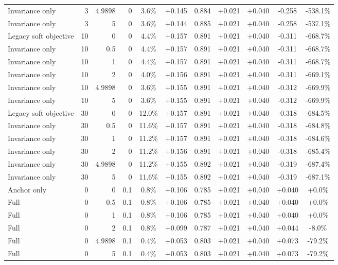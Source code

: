 \begin{table}[htbp]
\begin{tabular}{lrrrccccccc}
Invariance only & 3 & 4.9898 & 0 & 3.6\% & +0.145 & 0.884 & +0.021 & +0.040 & -0.258 & -538.1\% \\
Invariance only & 3 & 5 & 0 & 3.6\% & +0.144 & 0.885 & +0.021 & +0.040 & -0.258 & -537.1\% \\
Legacy soft objective & 10 & 0 & 0 & 4.4\% & +0.157 & 0.891 & +0.021 & +0.040 & -0.311 & -668.7\% \\
Invariance only & 10 & 0.5 & 0 & 4.4\% & +0.157 & 0.891 & +0.021 & +0.040 & -0.311 & -668.7\% \\
Invariance only & 10 & 1 & 0 & 4.4\% & +0.157 & 0.891 & +0.021 & +0.040 & -0.311 & -668.7\% \\
Invariance only & 10 & 2 & 0 & 4.0\% & +0.156 & 0.891 & +0.021 & +0.040 & -0.311 & -669.1\% \\
Invariance only & 10 & 4.9898 & 0 & 3.6\% & +0.155 & 0.891 & +0.021 & +0.040 & -0.312 & -669.9\% \\
Invariance only & 10 & 5 & 0 & 3.6\% & +0.155 & 0.891 & +0.021 & +0.040 & -0.312 & -669.9\% \\
Legacy soft objective & 30 & 0 & 0 & 12.0\% & +0.157 & 0.891 & +0.021 & +0.040 & -0.318 & -684.5\% \\
Invariance only & 30 & 0.5 & 0 & 11.6\% & +0.157 & 0.891 & +0.021 & +0.040 & -0.318 & -684.8\% \\
Invariance only & 30 & 1 & 0 & 11.2\% & +0.157 & 0.891 & +0.021 & +0.040 & -0.318 & -684.6\% \\
Invariance only & 30 & 2 & 0 & 11.2\% & +0.156 & 0.891 & +0.021 & +0.040 & -0.318 & -685.4\% \\
Invariance only & 30 & 4.9898 & 0 & 11.2\% & +0.155 & 0.892 & +0.021 & +0.040 & -0.319 & -687.4\% \\
Invariance only & 30 & 5 & 0 & 11.6\% & +0.155 & 0.892 & +0.021 & +0.040 & -0.319 & -687.1\% \\
Anchor only & 0 & 0 & 0.1 & 0.8\% & +0.106 & 0.785 & +0.021 & +0.040 & +0.040 & +0.0\% \\
Full & 0 & 0.5 & 0.1 & 0.8\% & +0.106 & 0.785 & +0.021 & +0.040 & +0.040 & +0.0\% \\
Full & 0 & 1 & 0.1 & 0.8\% & +0.106 & 0.785 & +0.021 & +0.040 & +0.040 & +0.0\% \\
Full & 0 & 2 & 0.1 & 0.8\% & +0.099 & 0.787 & +0.021 & +0.040 & +0.044 & -8.0\% \\
Full & 0 & 4.9898 & 0.1 & 0.4\% & +0.053 & 0.803 & +0.021 & +0.040 & +0.073 & -79.2\% \\
Full & 0 & 5 & 0.1 & 0.4\% & +0.053 & 0.803 & +0.021 & +0.040 & +0.073 & -79.2\% \\

\end{tabular}
\end{table}

